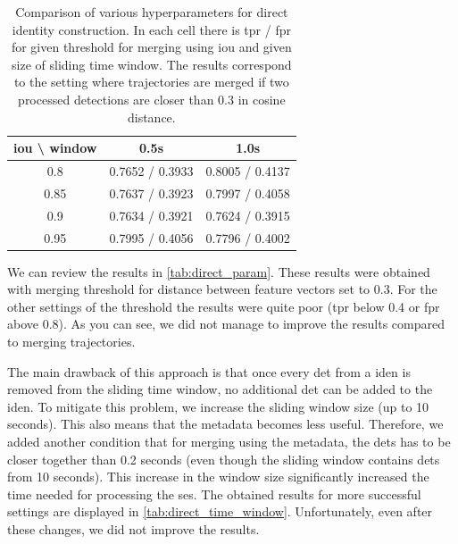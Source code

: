 \begin{table}[]
    \centering
    \begin{tabular}{c||c|c}
     \gls{iou} \textbackslash{} window & 0.5s & 1.0s \\ \hline \hline
     0.8 & 0.7652 / 0.3933 & 0.8005 / 0.4137 \\ \hline
     0.85 & 0.7637 / 0.3923 & 0.7997 / 0.4058 \\ \hline
     0.9 & 0.7634 / 0.3921 & 0.7624 / 0.3915 \\ \hline
     0.95 & 0.7995 / 0.4056 & 0.7796 / 0.4002 
    \end{tabular}
    \caption[Comparison of various hyperparameters for direct identity construction]{Comparison of various hyperparameters for direct identity construction. In each cell there is \gls{tpr} / \gls{fpr} for given threshold for merging using \gls{iou} and given size of sliding time window. The results correspond to the setting where trajectories are merged if two processed detections are closer than 0.3 in cosine distance.}
    \label{tab:direct_param}
\end{table}

We can review the results in \autoref{tab:direct_param}. These results were obtained with merging threshold for distance between feature vectors set to 0.3. For the other settings of the threshold the results were quite poor (\gls{tpr} below 0.4 or \gls{fpr} above 0.8). As you can see, we did not manage to improve the results compared to merging trajectories.

The main drawback of this approach is that once every \gls{det} from a \gls{iden} is removed from the sliding time window, no additional \gls{det} can be added to the \gls{iden}. To mitigate this problem, we increase the sliding window size (up to 10 seconds). This also means that the metadata becomes less useful. Therefore, we added another condition that for merging using the metadata, the \glspl{det} has to be closer together than 0.2 seconds (even though the sliding window contains \glspl{det} from 10 seconds). This increase in the window size significantly increased the time needed for processing the \gls{ses}. The obtained results for more successful settings are displayed in \autoref{tab:direct_time_window}. Unfortunately, even after these changes, we did not improve the results.

